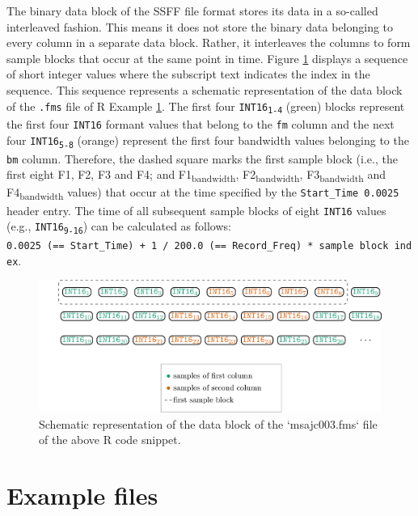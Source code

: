 \documentclass[]{book}
\begin{document}
The binary data block of the SSFF file format stores its data in a so-called interleaved fashion. This means it does not store the binary data belonging to every column in a separate data block. Rather, it interleaves the columns to form sample blocks that occur at the same point in time. Figure \ref{fig:wrassp-ssffDataBlock} displays a sequence of short integer values where the subscript text indicates the index in the sequence. This sequence represents a schematic representation of the data block of the \texttt{.fms} file of R Example \ref{fig:wrassp-ssffDataBlock}. The first four {\texttt{INT16}\textsubscript{\texttt{1-4}}} (green) blocks represent the first four \texttt{INT16} formant values that belong to the \texttt{fm} column and the next four {\texttt{INT16}\textsubscript{\texttt{5-8}}} (orange) represent the first four bandwidth values belonging to the \texttt{bm} column. Therefore, the dashed square marks the first sample block (i.e., the first eight F1, F2, F3 and F4; and F1\textsubscript{bandwidth}, F2\textsubscript{bandwidth}, F3\textsubscript{bandwidth} and F4\textsubscript{bandwidth} values) that occur at the time specified by the \texttt{Start\_Time\ 0.0025} header entry. The time of all subsequent sample blocks of eight \texttt{INT16} values (e.g., \texttt{INT16}\textsubscript{\texttt{9-16}}) can be calculated as follows:
\texttt{0.0025\ (==\ Start\_Time)\ +\ 1\ /\ 200.0\ (==\ Record\_Freq)\ *\ sample\ block\ index}.

\begin{figure}

{\centering \includegraphics[width=1\linewidth]{pics/ssffDataBlock} 

}

\caption{Schematic representation of the data block of the `msajc003.fms` file of the above R code snippet.}\label{fig:wrassp-ssffDataBlock}
\end{figure}

\hypertarget{example-files}{%
\section{Example files}\label{example-files}}
\end{document}
